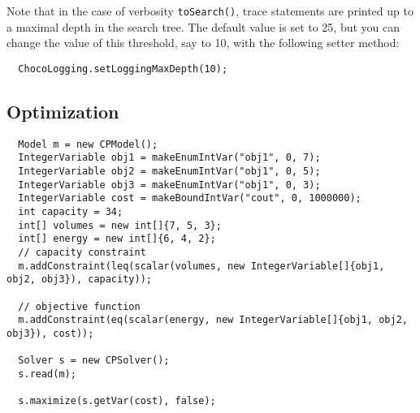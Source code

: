 Note that in the case of verbosity \texttt{toSearch()}, trace statements are printed up to a maximal depth in the search tree. The default value is set to 25, but you can change the value of this threshold, say to 10, with the following setter method:
\begin{lstlisting}
  ChocoLogging.setLoggingMaxDepth(10);
\end{lstlisting}

\subsection{Optimization}\label{solver:optimization}\hypertarget{solver:optimization}{}
\begin{lstlisting}
  Model m = new CPModel();
  IntegerVariable obj1 = makeEnumIntVar("obj1", 0, 7);
  IntegerVariable obj2 = makeEnumIntVar("obj1", 0, 5);
  IntegerVariable obj3 = makeEnumIntVar("obj1", 0, 3);
  IntegerVariable cost = makeBoundIntVar("cout", 0, 1000000);
  int capacity = 34;
  int[] volumes = new int[]{7, 5, 3};
  int[] energy = new int[]{6, 4, 2};
  // capacity constraint
  m.addConstraint(leq(scalar(volumes, new IntegerVariable[]{obj1, obj2, obj3}), capacity));
	
  // objective function
  m.addConstraint(eq(scalar(energy, new IntegerVariable[]{obj1, obj2, obj3}), cost));
  
  Solver s = new CPSolver();
  s.read(m);
  
  s.maximize(s.getVar(cost), false);
\end{lstlisting}
